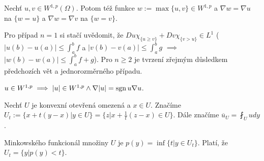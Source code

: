 \documentclass[12pt]{article}					%
\begin{document}
\begin{veta}
	Nechť $u, v \in W^{1, p}(Ω)$. Potom též funkce $w := \max \{u, v\} \in W^{1, p}$ a $\nabla w = \nabla u$ na $\{w = u\}$ a $\nabla w = \nabla v$ na $\{w = v\}$.

	\begin{dukazin}
		Pro případ $n = 1$ si stačí uvědomit, že $Duχ_{\{u ≥ v\}} + Dvχ_{\{v > u\}} \in L^1$ ($|u(b) - u(a)| ≤ \int_a^b f$ a $|v(b) - v(a)| ≤ \int_a^b g$ $\implies$ $|w(b) - w(a)| ≤ \int_a^b f + g$). Pro $n ≥ 2$ je tvrzení zřejmým důsledkem předchozích vět a jednorozměrného případu.
	\end{dukazin}
\end{veta}

\begin{dusledek}
	$u \in W^{1, p} \implies |u| \in W^{1, p} \land \nabla |u| = \operatorname{sgn} u \nabla u$.
\end{dusledek}



\begin{definice}
	Nechť $U$ je konvexní otevřená omezená a $x \in U$. Značíme $U_t := \{x + t(y - x) | y \in U\} = \{z | x + \frac{1}{t}(z - x) \in U\}$. Dále značíme $\overline{u}_U = \fint_{U} u dy$.

	Minkowského funkcionál množiny $U$ je $p(y) = \inf \{t | y \in U_t\}$. Platí, že $U_t = \{y | p(y) < t\}$.
\end{definice}
\end{document}
